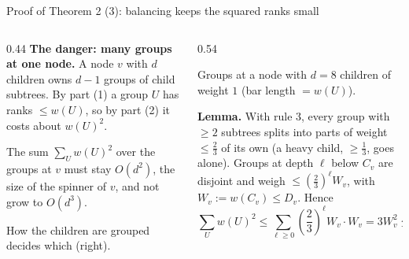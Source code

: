 \documentclass[aspectratio=169,11pt]{beamer}
\begin{document}
\begin{frame}{Proof of Theorem 2 (3): balancing keeps the squared ranks small}
\begin{columns}[T]
\begin{column}{0.44\textwidth}
\footnotesize
\textbf{The danger: many groups at one node.} A node $v$ with $d$ children owns $d-1$ groups of child subtrees.
By part (1) a group $U$ has ranks $\leq w(U)$, so by part (2) it costs about $w(U)^2$.

\vspace{2mm}
The sum $\sum_U w(U)^2$ over the groups at $v$ must stay $O(d^2)$, the size of the spinner of $v$, and not grow to
$O(d^3)$.

\vspace{2mm}
How the children are grouped decides which (right).
\end{column}
\begin{column}{0.54\textwidth}
\centering
{}

\vspace{1mm}
\scriptsize
Groups at a node with $d=8$ children of weight $1$ (bar length $=w(U)$).

\vspace{1mm}
\raggedright
\scriptsize
\textbf{Lemma.} With rule 3, every group with $\geq2$ subtrees splits into parts of weight $\leq\frac23$ of its own
(a heavy child, $\geq\frac13$, goes alone). Groups at depth $\ell$ below $C_v$ are disjoint and weigh
$\leq(\frac23)^\ell W_v$, with $W_v:=w(C_v)\leq D_v$. Hence
\[
\textstyle\sum_U w(U)^2\leq\sum_{\ell\geq0}(\frac23)^\ell W_v\cdot W_v=3W_v^2\leq 3D_v^2 .
\]
\end{column}
\end{columns}
\end{frame}
\end{document}
